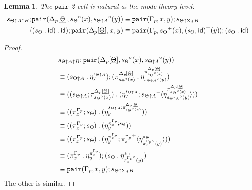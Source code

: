 \documentclass[10pt]{article}
\newtheorem{lemma}{Lemma}
\theoremstyle{definition}
\newcommand\TrPlus[2]{\ensuremath{{#1}^+(#2)}}
\newcommand\TrCirc[2]{\ensuremath{{#1}^\circ(#2)}}
\newcommand{\id}{\mathsf{id}}
\newcommand\ApPlus[2]{\ensuremath{{#1}^+ \langle #2 \rangle }}
\newcommand\bdot[0]{\mathbin{.}}
\begin{document}
\begin{lemma}
The $\mathtt{pair}$ 2-cell is natural at the mode-theory level:
\begin{align*}
s_{\Theta \uparrow A \uparrow B};\mathtt{pair}(\asdep{\Delta}[\downstairs{\Theta}],\TrCirc{s_\Theta}{x},\TrCirc{s_{\Theta \uparrow A}}{y}) &\equiv \mathtt{pair}(\asdep{\Gamma},x,y);s_{\Theta \uparrow \Sigma_A B} \\
((s_\Theta \bdot \id) \bdot \id);\mathtt{pair}(\asdep{\Delta}[\downstairs{\Theta}], x, y) &\equiv \mathtt{pair}(\asdep{\Gamma},\TrPlus{s_\Theta}{x},\TrPlus{(s_\Theta, \id)}{y});(s_\Theta \bdot \id)
\end{align*}
\end{lemma}
\begin{proof}
\begin{align*}
&s_{\Theta \uparrow A \uparrow B};\mathtt{pair}(\asdep{\Delta}[\downstairs{\Theta}],\TrCirc{s_\Theta}{x},\TrCirc{s_{\Theta \uparrow A}}{y}) \\
&\equiv (s_{\Theta \uparrow A} \bdot \eta^{s_{\Theta \uparrow A}}_y);(\pi^{\asdep{\Delta}[\downstairs{\Theta}]}_{\TrCirc{s_\Theta}{x}} \bdot \eta^{\pi^{\asdep{\Delta}[\downstairs{\Theta}]}_{\TrCirc{s_\Theta}{x}}}_{\TrCirc{s_{\Theta \uparrow A}}{y}}) \\
&\equiv ((s_{\Theta \uparrow A} ; \pi^{\asdep{\Delta}[\downstairs{\Theta}]}_{\TrCirc{s_\Theta}{x}}) \bdot (\eta^{s_{\Theta \uparrow A}}_y ; \ApPlus{s_{\Theta \uparrow A}}{\eta^{\pi^{\asdep{\Delta}[\downstairs{\Theta}]}_{\TrCirc{s_\Theta}{x}}}_{\TrCirc{s_{\Theta \uparrow A}}{y}}})) \\
&\equiv ((\pi^{\asdep{\Gamma}}_x ; s_\Theta) \bdot (\eta^{s_{\Theta \uparrow A};\pi^{\asdep{\Delta}[\downstairs{\Theta}]}_{\TrCirc{s_\Theta}{x}}}_y)) \\
&\equiv ((\pi^{\asdep{\Gamma}}_x ; s_\Theta) \bdot (\eta^{\pi^{\asdep{\Gamma}}_x;s_{\Theta}}_y)) \\
&\equiv ((\pi^{\asdep{\Gamma}}_x ; s_\Theta) \bdot (\eta^{\pi^{\asdep{\Gamma}}_x}_y ; \ApPlus{\pi^{\asdep{\Gamma}}_x}{\eta^{s_\Theta}_{\TrCirc{\pi^{\asdep{\Gamma}}_x}{y}}})) \\
&\equiv (\pi^{\asdep{\Gamma}}_x \bdot \eta^{\pi^{\asdep{\Gamma}}_x}_y);(s_\Theta \bdot \eta^{s_\Theta}_{\TrCirc{\pi^{\asdep{\Gamma}}_x}{y}}) \\
&\equiv \mathtt{pair}(\asdep{\Gamma},x,y);s_{\Theta \uparrow \Sigma_A B}
\end{align*}
The other is similar.
\end{proof}
\end{document}
